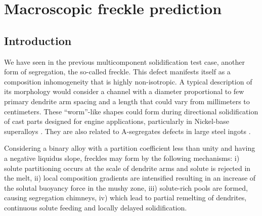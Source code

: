 \section{Macroscopic freckle prediction}
\subsection{Introduction}
We have seen in the previous multicomponent solidification test case, another form of segregation, the so-called freckle. 
This defect manifests itself as a composition inhomogeneity that is highly non-isotropic. A typical description of its 
morphology would consider a channel with a diameter proportional to few primary dendrite arm spacing and a length that 
could vary from millimeters to centimeters. These “worm”-like shapes could form during directional solidification of cast 
parts designed for engine applications, particularly in Nickel-base superalloys \citep{giamei_nature_1970,beckermann_development_2000,
genereux_characterization_2000,schneider_modeling_1997}. They are also related to A-segregates defects in large steel ingots 
\citep{pickering_macrosegregation_2013}. 

Considering a binary alloy with a partition coefficient less than unity and having a negative liquidus slope, 
freckles may form by the following mechanisms: i) solute partitioning occurs at the scale of dendrite arms and 
solute is rejected in the melt, ii) local composition gradients are intensified resulting in an increase of the 
solutal buoyancy force in the mushy zone, iii) solute-rich pools are formed, causing segregation chimneys, iv) 
which lead to partial remelting of dendrites, continuous solute feeding and locally delayed solidification.

